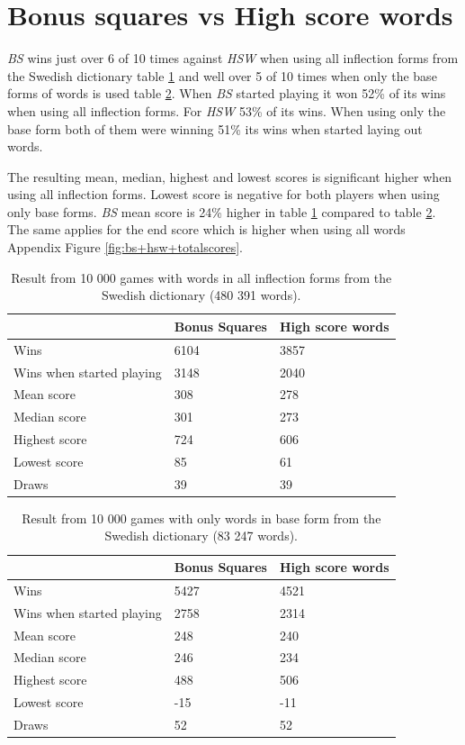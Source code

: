 \documentclass[a4paper, 12pt]{report}
\begin{document}
\section{Bonus squares vs High score words}
\emph{BS} wins just over 6 of 10 times against \emph{HSW} when using all inflection forms from the Swedish dictionary table \ref{table:bs+hsw+allwords} and well over 5 of 10 times when only the base forms of words is used table \ref{table:bs+hsw+baseforms}. When \emph{BS} started playing it won 52\% of its wins when using all inflection forms. For \emph{HSW} 53\% of its wins. When using only the base form both of them were winning 51\% its wins when started laying out words.

The resulting mean, median, highest and lowest scores is significant higher when using all inflection forms. Lowest score is negative for both players when using only base forms. \emph{BS} mean score is 24\% higher in table \ref{table:bs+hsw+allwords} compared to table \ref{table:bs+hsw+baseforms}. The same applies for the end score which is higher when using all words Appendix Figure \ref{fig:bs+hsw+totalscores}.

\begin{table}[h]
\centering
    \begin{tabular}{ l | l | l }
   	& Bonus Squares & High score words \\
   	\hline
   	Wins & 6104 & 3857 \\
	Wins when started playing & 3148 & 2040 \\   	
	Mean score & 308 & 278 \\
	Median score & 301 & 273 \\	 	 
	Highest score & 724 & 606 \\
	Lowest score & 85 & 61 \\		
	\hline 
   	Draws & 39 & 39 \\
    \end{tabular}
\caption{Result from 10 000 games with words in all inflection forms from the Swedish dictionary (480 391 words).}
\label{table:bs+hsw+allwords}
\end{table}

\begin{table}[h]
\centering
    \begin{tabular}{ l | l | l }
   	& Bonus Squares & High score words \\
   	\hline
   	Wins & 5427 & 4521 \\
	Wins when started playing & 2758 & 2314 \\   	
	Mean score & 248 & 240 \\
	Median score & 246 & 234 \\	 	 
	Highest score & 488 & 506 \\
	Lowest score & -15 & -11 \\		
	\hline 
   	Draws & 52 & 52 \\
    \end{tabular}
\caption{Result from 10 000 games with only words in base form from the Swedish dictionary (83 247 words).}
\label{table:bs+hsw+baseforms}
\end{table}
\end{document}
